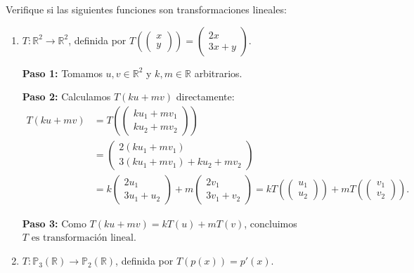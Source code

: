 \begin{example}
Verifique si las siguientes funciones son transformaciones lineales:

\begin{enumerate}
    \item $T:\mathbb{R}^2 \to \mathbb{R}^2$, definida por $T\left(\begin{pmatrix}x\\y\end{pmatrix}\right)= \begin{pmatrix}2x\\3x+y\end{pmatrix}$.

    \begin{myproof}
    \textbf{Paso 1:} Tomamos $u, v \in \mathbb{R}^2$ y $k, m \in \mathbb{R}$ arbitrarios.

    \textbf{Paso 2:} Calculamos $T(ku + mv)$ directamente:
    \begin{align*}
        T(ku + mv) &= T\left(\begin{pmatrix}ku_1 + mv_1 \\ ku_2 + mv_2\end{pmatrix}\right) \\
        &= \begin{pmatrix}2(ku_1 + mv_1) \\ 3(ku_1 + mv_1) + ku_2 + mv_2\end{pmatrix} \\
        &= k\begin{pmatrix}2u_1 \\ 3u_1 + u_2\end{pmatrix} + m\begin{pmatrix}2v_1 \\ 3v_1 + v_2\end{pmatrix}
        = kT\left(\begin{pmatrix}u_1\\u_2\end{pmatrix}\right) + mT\left(\begin{pmatrix}v_1\\v_2\end{pmatrix}\right).
    \end{align*}

    \textbf{Paso 3:} Como $T(ku+mv)=kT(u)+mT(v)$, concluimos $\boxed{T \text{ es transformación lineal}}$.
    \end{myproof}

    \item $T: \mathbb{P}_3(\mathbb{R}) \to \mathbb{P}_2(\mathbb{R})$, definida por $T(p(x)) = p'(x)$.


\end{enumerate}
\end{example}

